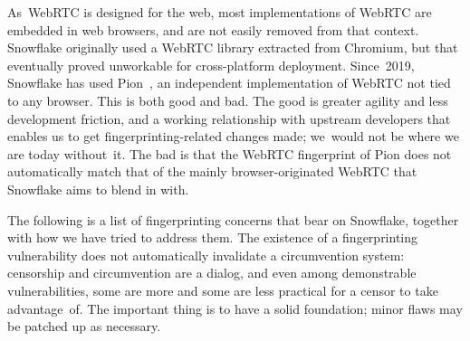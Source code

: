 \documentclass[letterpaper,twocolumn]{article}
\begin{document}
As~WebRTC is designed for the web,
most implementations of WebRTC are embedded in web browsers,
and are not easily removed from that context.
Snowflake originally used a WebRTC library extracted from Chromium,
but that eventually proved unworkable for cross-platform deployment.
Since~2019, Snowflake has used Pion~\cite{pion-webrtc},
an independent implementation of WebRTC
not tied to any browser.
This is both good and bad.
The good is greater agility and less development friction,
and a working relationship with upstream developers
that enables us to get fingerprinting-related changes made;
we~would not be where we are today without~it.
The bad is that the WebRTC fingerprint of Pion
does not automatically match that of the mainly browser-originated
WebRTC that Snowflake aims to blend in with.

The following is a list of fingerprinting concerns
that bear on Snowflake, together with
how we have tried to address them.
The existence of a fingerprinting vulnerability
does not automatically invalidate a circumvention system:
censorship and circumvention are a dialog,
and even among demonstrable vulnerabilities,
some are more and some are less practical for a censor to take advantage~of.
The important thing is to have a solid foundation;
minor flaws may be patched up as necessary.
\end{document}
